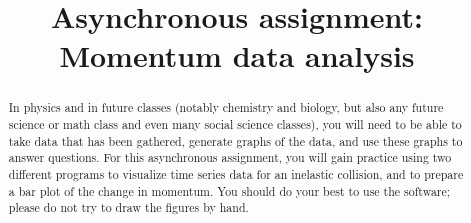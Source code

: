 \documentclass [hw,addpoints,noanswers]{exam}
\title{Asynchronous assignment: Momentum data analysis}
\author{\mobeardInstructorShort}
\date{\printdate{4/27/2021}}
\begin{document}
\maketitle

\begin{abstract}
In physics and in future classes (notably chemistry and biology, but also any future science or math class and even many social science classes), you will need to be able to take data that has been gathered, generate graphs of the data, and use these graphs to answer questions. For this asynchronous assignment, you will gain practice using two different programs to visualize time series data for an inelastic collision, and to prepare a bar plot of the change in momentum. You should do your best to use the software; please do not try to draw the figures by hand. 
\end{abstract}
\end{document}
